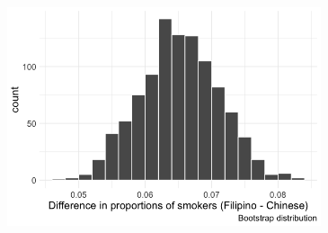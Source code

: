 \documentclass[
  letterpaper,
  DIV=11,
  numbers=noendperiod]{scrartcl}
\begin{document}
\begin{enumerate}
\begin{enumerate}
    \includegraphics[width=3.63542in,height=\textheight]{images/14-asian-tobacco-boot.png}
  \end{enumerate}
\end{enumerate}
\end{document}

